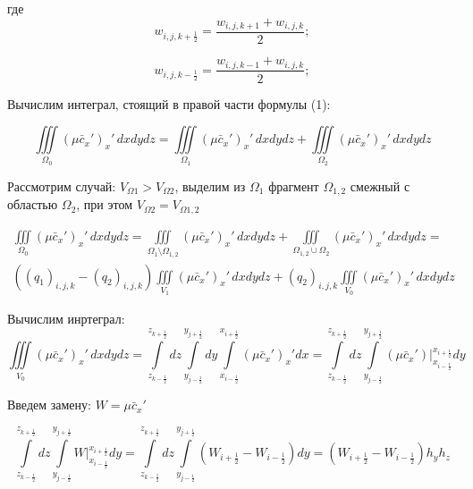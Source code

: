 \documentclass[12pt]{article}
\begin{document}
где 
\begin{equation*} 
	w_{{i,j},k+\frac{1}{2}} = \frac{w_{i,j,k+1}+w_{i,j,k}}{2};
\end{equation*}

\begin{equation*} 
	w_{{i,j},k-\frac{1}{2}} = \frac{w_{i,j,k-1}+w_{i,j,k}}{2};
\end{equation*}

Вычислим интеграл, стоящий в правой части формулы (1):

\begin{equation*} 
	\iiint\limits_{\Omega_0} (\mu\bar{c}_x')_x'\,dxdydz = \iiint\limits_{\Omega_1} (\mu\bar{c}_x')_x'\,dxdydz + \iiint\limits_{\Omega_2} (\mu\bar{c}_x')_x'\,dxdydz
\end{equation*}

Рассмотрим случай: $V_{\Omega1}>V_{\Omega2}$, выделим из  $\Omega_1$ фрагмент $\Omega_{1,2}$ смежный  с областью $\Omega_2$,  при этом   $V_{\Omega2}=V_{\Omega{1,2}}$

\begin{multline*} 
	\iiint\limits_{\Omega_0} (\mu\bar{c}_x')_x'\,dxdydz = \iiint\limits_{\Omega_1\setminus\Omega_{1,2}} (\mu\bar{c}_x')_x'\,dxdydz + \iiint\limits_{\Omega_{1,2}\cup\Omega_2}(\mu\bar{c}_x')_x'\,dxdydz = \\
	((q_1)_{i,j,k} - (q_2)_{i,j,k})\iiint\limits_{V_1} (\mu\bar{c}_x')_x'\,dxdydz + (q_2)_{i,j,k}\iiint\limits_{V_0} (\mu\bar{c}_x')_x'\,dxdydz
\end{multline*}

Вычислим инртеграл:
\begin{equation*}
\iiint\limits_{V_0} (\mu\bar{c}_x')_x'\,dxdydz = \int\limits_{z_{k-\frac{1}{2}}}^{z_{k+\frac{1}{2}}}dz \int\limits_{y_{j-\frac{1}{2}}}^{y_{j+\frac{1}{2}}}dy\int\limits_{x_{i-\frac{1}{2}}}^{x_{i+\frac{1}{2}}}(\mu\bar{c}_x')_x'dx = \int\limits_{z_{k-\frac{1}{2}}}^{z_{k+\frac{1}{2}}}dz \int\limits_{y_{j-\frac{1}{2}}}^{y_{j+\frac{1}{2}}}(\mu\bar{c}_x')\bigg|_{x_{i-\frac{1}{2}}}^{x_{i+\frac{1}{2}}}dy
\end{equation*}

Введем замену:
$W=\mu\bar{c}_x'$

\begin{equation*}
	\int\limits_{z_{k-\frac{1}{2}}}^{z_{k+\frac{1}{2}}}dz \int\limits_{y_{j-\frac{1}{2}}}^{y_{j+\frac{1}{2}}}W\bigg|_{x_{i-\frac{1}{2}}}^{x_{i+\frac{1}{2}}}dy = \int\limits_{z_{k-\frac{1}{2}}}^{z_{k+\frac{1}{2}}}dz \int\limits_{y_{j-\frac{1}{2}}}^{y_{j+\frac{1}{2}}}(W_{i+\frac{1}{2}}- W_{i-\frac{1}{2}})dy = (W_{i+\frac{1}{2}}- W_{i-\frac{1}{2}})h_yh_z
\end{equation*}	
	
\end{document}
